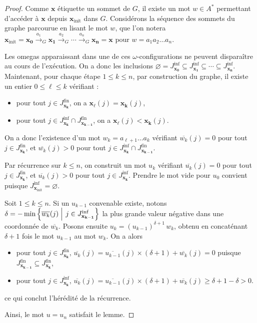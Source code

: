 \documentclass[a4paper,final]{article}
\theoremstyle{definition}
\let\leq\leqslant
\let\geq\geqslant
\newcommand{\set}[2]{\left\{#1\mathrel{\left|\vphantom{#1}\vphantom{#2}\right.}#2\right\}}
\newcommand{\eqfin}{\ensuremath{=_\text{fin}}}
\let\inter\cap
\let\vide\varnothing
\newcommand{\trans}[2]{\ensuremath{\stackrel{#1}{\longrightarrow}_{#2}}}
\newcommand{\vect}[1]{\ensuremath{\mathbf{#1}}}
\newcommand{\xinit}{\ensuremath{\vect{x}_\text{init}}}
\newcommand{\valeur}[1]{\ensuremath{\overline{#1}}}
\newcommand{\Jfin}[1]{J^\text{fin}_{#1}}
\newcommand{\Jinf}[1]{J^\text{inf}_{#1}}
\begin{document}
\begin{proof}
Comme $\vect{x}$ étiquette un sommet de $G$, il existe un mot $w \in A^*$ permettant d'accéder à $\vect{x}$ depuis $\xinit$ dans $G$.
Considérons la séquence des sommets du graphe parcourue en lisant le mot $w$, 
que l'on notera $\xinit = \vect{x_0} \trans{a_1}{G} \vect{x_1} \trans{a_2}{G} \cdots \trans{a_n}{G} \vect{x_n} = \vect{x}$ pour $w = a_1 a_2 \dots a_n$.

Les omegas apparaissant dans une de ces $\omega$-configurations ne peuvent disparaître au cours de l'exécution.
On a donc les inclusions $\vide = \Jinf{\vect{x_0}} \subseteq \Jinf{\vect{x_1}} \subseteq \cdots \subseteq \Jinf{\vect{x_n}}$.
Maintenant, pour chaque étape $1 \leq k \leq n$, 
par construction du graphe, il existe un entier $0 \leq \ell \leq k$ vérifiant :
\begin{itemize}
    \item pour tout $j \in \Jfin{\vect{x_k}}$, on a $\vect{x_\ell}(j) = \vect{x_k}(j)$, %
    \item pour tout $j \in \Jinf{\vect{x_k}} \inter \Jfin{\vect{x_{k-1}}}$, on a $\vect{x_\ell}(j) < \vect{x_k}(j)$.
\end{itemize}
On a donc l'existence d'un mot $w_k = a_{\ell+1} \dots a_k$ vérifiant
$\valeur{w_k}(j)=0$ pour tout $j \in \Jfin{\vect{x_k}}$, et
$\valeur{w_k}(j)>0$ pour tout $j \in \Jinf{\vect{x_k}} \inter \Jfin{\vect{x_{k-1}}}$.

\vspace{2mm}
Par récurrence sur $k \leq n$, on construit un mot $u_k$ vérifiant 
$\valeur{u_k}(j) = 0$ pour tout $j \in \Jfin{\vect{x_k}}$, et
$\valeur{u_k}(j) > 0$ pour tout $j \in \Jinf{\vect{x_k}}$.
Prendre le mot vide pour $u_0$ convient puisque $\Jinf{\xinit} = \vide$.

Soit $1 \leq k \leq n$.
Si un $u_{k-1}$ convenable existe, notons $\delta = - \min \set{\valeur{w_k}(j)}{j \in \Jinf{\vect{x_{k-1}}}}$ la plus grande valeur négative dans une coordonnée de $\valeur{w_k}$.
Posons ensuite $u_k = {(u_{k-1})}^{\delta + 1} \, w_k$, obtenu en concaténant $\delta + 1$ fois le mot $u_{k-1}$ au mot $w_k$.
On a alors
\begin{itemize}
    \item pour tout $j \in \Jfin{\vect{x_k}}$, $\valeur{u_k}(j) = \valeur{u_{k-1}}(j) \times (\delta + 1) + \valeur{w_k}(j) = 0$ puisque $\Jfin{\vect{x_{k-1}}} \subseteq \Jfin{\vect{x_k}}$,
    \item pour tout $j \in \Jinf{\vect{x_k}}$, $\valeur{u_k}(j) = \valeur{u_{k-1}}(j) \times (\delta + 1) + \valeur{w_k}(j) \geq \delta + 1 - \delta > 0$.
\end{itemize}
ce qui conclut l'hérédité de la récurrence.

\vspace{2mm}
Ainsi, le mot $u = u_n$ satisfait le lemme.
\end{proof}
\end{document}
